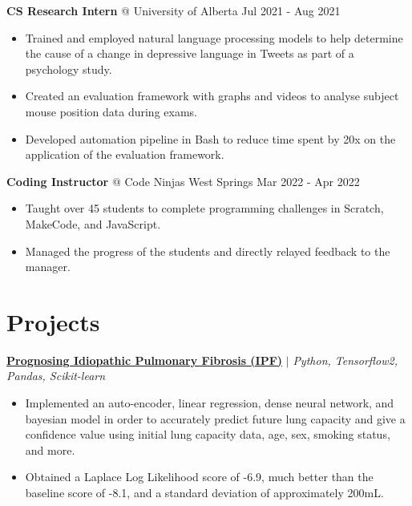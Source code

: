 \documentclass{article}
\makeatletter
\newcommand{\smallbullet}{\,\begin{picture}(-1,1)(-1,-3)\circle*{3}\end{picture}\ }
\newenvironment{resumeItem}
{
    \vspace{0.5em}
}
{
}
\newcommand{\projectHead}[3]{
    \textbf{#1} $\vert$ \textit{#2} \\[-1.2em]
}
\newcommand{\experienceHead}[4]{
    \textbf{#1} @ #2 \hfill #3 \\[-1.2em]
}
\newenvironment{resumeList}
{
    \begin{itemize}[label=\smallbullet]
}
{
    \end{itemize}
}
\makeatother
\begin{document}

\begin{resumeItem}
\experienceHead{CS Research Intern}{University of Alberta}{Jul 2021 - Aug 2021}{Online}
\begin{resumeList}
    \item Trained and employed natural language processing models to help determine the cause of a change in depressive language in Tweets as part of a psychology study.
    \item Created an evaluation framework with graphs and videos to analyse subject mouse position data during exams.
    \item Developed automation pipeline in Bash to reduce time spent by 20x on the application of the evaluation framework.
\end{resumeList}
\end{resumeItem}

\begin{resumeItem}
\experienceHead{Coding Instructor}{Code Ninjas West Springs}{Mar 2022 - Apr 2022}{Calgary, AB.}
\begin{resumeList}
    \item Taught over 45 students to complete programming challenges in Scratch, MakeCode, and JavaScript.
    \item Managed the progress of the students and directly relayed feedback to the manager.
\end{resumeList}
\end{resumeItem}


\section{Projects}

\begin{resumeItem}
\projectHead{\href{https://github.com/arnavcs/OSIC-IPF}{Prognosing Idiopathic Pulmonary Fibrosis (IPF)}}{Python, Tensorflow2, Pandas, Scikit-learn}{Dec 2020 - Jun 2021}
\begin{resumeList}
    \item Implemented an auto-encoder, linear regression, dense neural network, and bayesian model in order to accurately predict future lung capacity and give a confidence value using initial lung capacity data, age, sex, smoking status, and more.
    \item Obtained a Laplace Log Likelihood score of -6.9, much better than the baseline score of -8.1, and a standard deviation of approximately 200mL.
\end{resumeList}
\end{resumeItem}
\end{document}
